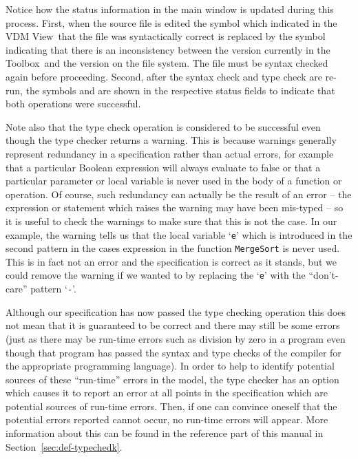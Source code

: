\documentclass[\pformat,12pt]{article}
\newcommand{\Toolbox}{Toolbox}
\newcommand{\vdmModView}{\guicmd{VDM View}}
\newcommand{\guicmd}[1]{{\sf #1}}
\begin{document}
Notice how the status information in the main window is updated
during this process. First, when the source file is edited the symbol 
which indicated in the \vdmModView\ that the file was
syntactically correct is replaced by the symbol 
indicating that there is an inconsistency between the version
currently in the \Toolbox\ and the version on the file system. The
file must be syntax checked again before proceeding. Second, after the
syntax check and type check are re-run, the symbols 
and
are shown in the respective status fields to indicate that both
operations were successful.

Note also that the type check operation is considered to be successful
even though the type checker returns a warning. This is because
warnings generally represent redundancy in a specification rather than
actual errors, for example that a particular Boolean expression will
always evaluate to false or that a particular parameter or local
variable is never used in the body of a function or operation. Of
course, such redundancy can actually be the result of an error -- the
expression or statement which raises the warning may have been
mis-typed -- so it is useful to check the warnings to make sure that
this is not the case. In our example, the warning tells us that the
local variable `{\tt e}' which is introduced in the second pattern in
the cases expression in the function {\tt MergeSort} is never
used. This is in fact not an error and the specification is correct as
it stands, but we could remove the warning if we wanted to by
replacing the `{\tt e}' with the ``don't-care'' pattern `{\tt -}'.

Although our specification has now passed the type checking operation
this does not mean that it is guaranteed to be correct and there may
still be some errors (just as there may be run-time errors such as
division by zero in a program even though that program has passed the
syntax and type checks of the compiler for the appropriate programming
language). In order to help to identify potential sources of these
``run-time'' errors in the model, the type checker has an option which
causes it to report an error at all points in the specification which
are potential sources of run-time errors. Then, if one can convince
oneself that the potential errors reported cannot occur, no run-time
errors will appear.  More information about this can be found in the 
reference part of this manual in Section~\ref{sec:def-typechedk}.
\end{document}
